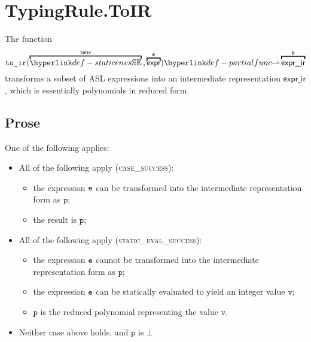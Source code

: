 \documentclass{book}
\newcommand\toir[0]{\texttt{to\_ir}}
\newcommand\exprir[0]{\textsf{expr\_ir}}
\newcommand\vp[0]{\texttt{p}}
\newcommand\vv[0]{\texttt{v}}
\begin{document}
\section{TypingRule.ToIR}
The function
\[
  \toir(\overname{\staticenvs}{\tenv} \aslsep \overname{\expr}{\ve}) \partialto \overname{\exprir}{\vp}
\]
transforms a subset of ASL expressions into
an intermediate representation $\exprir$, which is essentially polynomials in reduced form.

\subsection{Prose}
One of the following applies:
\begin{itemize}
  \item All of the following apply (\textsc{case\_success}):
  \begin{itemize}
    \item the expression $\texttt{e}$ can be transformed into the intermediate representation form as $\vp$;
    \item the result is $\vp$;
  \end{itemize}

  \item All of the following apply (\textsc{static\_eval\_success}):
  \begin{itemize}
    \item the expression $\texttt{e}$ cannot be transformed into the intermediate representation form as $\vp$;
    \item the expression $\texttt{e}$ can be statically evaluated to yield an integer value $\vv$;
    \item $\vp$ is the reduced polynomial representing the value $\vv$.
  \end{itemize}

  \item Neither case above holds, and $\vp$ is $\bot$
\end{itemize}
\end{document}
